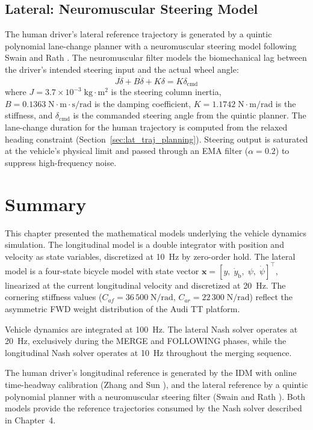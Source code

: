 \documentclass[12pt,a4paper,oneside]{report}
\begin{document}
\subsection{Lateral: Neuromuscular Steering Model}

The human driver's lateral reference trajectory is generated by a quintic polynomial
lane-change planner with a neuromuscular steering model following Swain and Rath
\cite{swainCooperativeGameTheory2023}. The neuromuscular filter models the biomechanical lag between
the driver's intended steering input and the actual wheel angle:
\begin{equation}
J\ddot{\delta} + B\dot{\delta} + K\delta = K\delta_{\text{cmd}}
\label{eq:neuromuscular}
\end{equation}
where $J = 3.7 \times 10^{-3}\;\mathrm{kg\cdot m^2}$ is the steering column inertia,
$B = 0.1363\;\mathrm{N\cdot m\cdot s/rad}$ is the damping coefficient, $K = 1.1742\;\mathrm{N\cdot m/rad}$
is the stiffness, and $\delta_{\text{cmd}}$ is the commanded steering angle from the
quintic planner. The lane-change duration for the human trajectory is computed from the
relaxed heading constraint (Section~\ref{sec:lat_traj_planning}). Steering output is
saturated at the vehicle's physical limit and passed through an EMA filter
($\alpha = 0.2$) to suppress high-frequency noise.


\section{Summary}

This chapter presented the mathematical models underlying the vehicle dynamics simulation.
The longitudinal model is a double integrator with position and velocity as state variables,
discretized at 10~Hz by zero-order hold. The lateral model is a four-state bicycle model
with state vector $\mathbf{x} = [y,\;\dot{y}_{\text{b}},\;\psi,\;\dot{\psi}]^{\top}$,
linearized at the current longitudinal velocity and discretized at 20~Hz. The cornering
stiffness values ($C_{af} = 36\,500\;\mathrm{N/rad}$, $C_{ar} = 22\,300\;\mathrm{N/rad}$)
reflect the asymmetric FWD weight distribution of the Audi TT platform.

Vehicle dynamics are integrated at 100~Hz. The lateral Nash solver operates at 20~Hz,
exclusively during the MERGE and FOLLOWING phases, while the longitudinal Nash solver
operates at 10~Hz throughout the merging sequence.

The human driver's longitudinal reference is generated by the IDM with online time-headway
calibration (Zhang and Sun \cite{zhangBayesianCalibrationIntelligent2024}), and the lateral reference by a quintic
polynomial planner with a neuromuscular steering filter (Swain and Rath \cite{swainCooperativeGameTheory2023}).
Both models provide the reference trajectories consumed by the Nash solver described in
Chapter~4.
\end{document}
